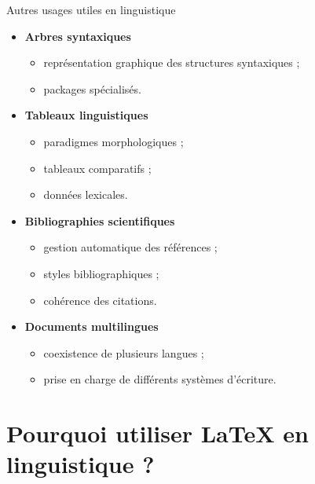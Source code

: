 \documentclass[aspectratio=169]{beamer}
\begin{document}
	\begin{frame}{Autres usages utiles en linguistique}
		\begin{itemize}
			\item \textbf{Arbres syntaxiques}
			\begin{itemize}
				\item représentation graphique des structures syntaxiques ;
				\item packages spécialisés.
			\end{itemize}
			
			\vspace{0.3cm}
			
			\item \textbf{Tableaux linguistiques}
			\begin{itemize}
				\item paradigmes morphologiques ;
				\item tableaux comparatifs ;
				\item données lexicales.
			\end{itemize}
			
			\vspace{0.3cm}
			
			\item \textbf{Bibliographies scientifiques}
			\begin{itemize}
				\item gestion automatique des références ;
				\item styles bibliographiques ;
				\item cohérence des citations.
			\end{itemize}
			
			\vspace{0.3cm}
			
			\item \textbf{Documents multilingues}
			\begin{itemize}
				\item coexistence de plusieurs langues ;
				\item prise en charge de différents systèmes d’écriture.
			\end{itemize}
		\end{itemize}
	\end{frame}
	
	
	\section{Pourquoi utiliser \LaTeX{} en linguistique ?}
	
\end{document}
